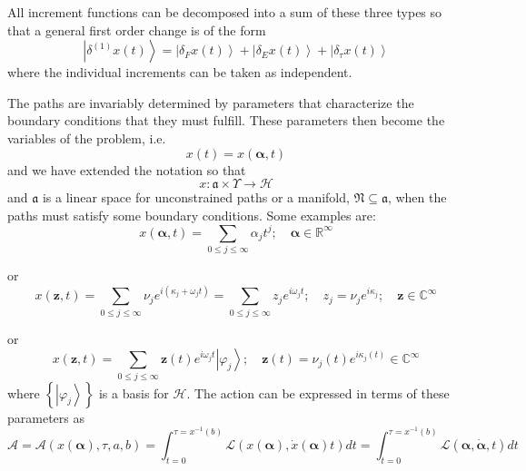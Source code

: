 \documentclass[aps,preprint]{revtex4}
\begin{document}
All increment functions can be decomposed into a sum of these three types so
that a general first order change is of the form
\begin{equation}
\left\vert \delta ^{\left( 1\right) }x\left( t\right) \right\rangle
=\left\vert \delta _{F}x\left( t\right) \right\rangle +\left\vert \delta
_{E}x\left( t\right) \right\rangle +\left\vert \delta _{\tau }x\left(
t\right) \right\rangle
\end{equation}%
where the individual increments can be taken as independent.

The paths are invariably determined by parameters that characterize the
boundary conditions that they must fulfill. These parameters then become the
variables of the problem, i.e.%
\begin{equation}
x\left( t\right) =x\left( \mathbf{\alpha ,}t\right)
\end{equation}%
and we have extended the notation so that
\begin{equation}
x:\mathfrak{a}\times \Upsilon \rightarrow \mathcal{H}
\end{equation}%
and $\mathfrak{a}$ is a linear space for unconstrained paths or a manifold, $%
\mathfrak{N}\subseteq \mathfrak{a}$, when the paths must satisfy some
boundary conditions. Some examples are:%
\begin{equation}
x\left( \mathbf{\alpha },t\right) =\sum_{0\leq j\leq \infty }\alpha
_{j}t^{j};\quad \mathbf{\alpha \in }\mathbb{R}^{\infty }
\end{equation}

or%
\begin{equation}
x\left( \mathbf{z,}t\right) =\sum_{0\leq j\leq \infty }\nu _{j}e^{i\left(
\kappa _{j}+\omega _{j}t\right) }=\sum_{0\leq j\leq \infty }z_{j}e^{i\omega
_{j}t};\quad z_{j}=\nu _{j}e^{i\kappa _{j}};\quad \mathbf{z\in }\mathbb{C}%
^{\infty }
\end{equation}

or%
\begin{equation}
x\left( \mathbf{z},t\right) =\sum_{0\leq j\leq \infty }\mathbf{z}\left(
t\right) e^{i\omega _{j}t}\left\vert \varphi _{j}\right\rangle ;\quad
\mathbf{z}\left( t\right) =\nu _{j}\left( t\right) e^{i\kappa _{j}\left(
t\right) }\mathbf{\in }\mathbb{C}^{\infty }
\end{equation}%
where $\left\{ \left\vert \varphi _{j}\right\rangle \right\} $ is a basis
for $\mathcal{H}$. The action can be expressed in terms of these parameters
as
\begin{equation}
\mathcal{A}=\mathcal{A}\left( x\left( \mathbf{\alpha }\right) ,\tau
,a,b\right) =\int_{t=0}^{\tau =x^{-1}\left( b\right) }\mathcal{L}\left(
x\left( \mathbf{\alpha }\right) ,\dot{x}\left( \mathbf{\alpha }\right)
t\right) dt=\int_{t=0}^{\tau =x^{-1}\left( b\right) }\mathcal{L}\left(
\mathbf{\alpha },\mathbf{\dot{\alpha},}t\right) dt
\end{equation}
\end{document}
